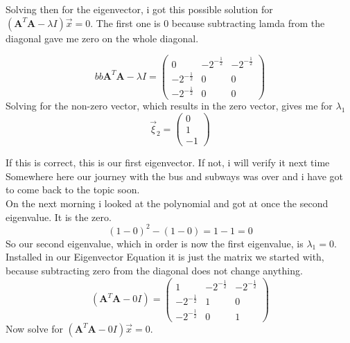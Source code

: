 \documentclass[a4paper]{article}
\begin{document}
\begin{PropositionOpt4}
Solving then for the eigenvector, i got this possible solution for $(\boldsymbol{A}^{T}\boldsymbol{A}-\lambda I)\vec{x}=0$. The first one is 0 because subtracting lamda from the diagonal gave me zero on the whole diagonal.

\begin{displaymath}bb
\boldsymbol{A}^{T}\boldsymbol{A}-\lambda{I} = \begin{pmatrix}0&-2^{-\frac12}&-2^{-\frac12}\\-2^{-\frac12}&0&0\\-2^{-\frac12}&0&0\end{pmatrix}
\end{displaymath}
Solving for the non-zero vector, which results in the zero vector, gives me for $\lambda_{1}$
\begin{displaymath}
\vec{\xi}_{2} = \begin{pmatrix}0\\1\\-1\end{pmatrix}
\end{displaymath}

If this is correct, this is our first eigenvector. If not, i will verify it next time\\

Somewhere here our journey with the bus and subways was over and i have got to come back to the topic soon.\\

On the next morning i looked at the polynomial and got at once the second eigenvalue. It is the zero.
\begin{displaymath}
(1-0)^{2}-(1-0) = 1-1 = 0
\end{displaymath}
So our second eigenvalue, which in order is now the first eigenvalue, is $\lambda_1 = 0$. Installed in our Eigenvector Equation it is just the matrix we started with, because subtracting zero from the diagonal does not change anything.
\begin{displaymath}
(\boldsymbol{A}^{T}\boldsymbol{A}-0I) = \begin{pmatrix}1&-2^{-\frac12}&-2^{-\frac12}\\-2^{-\frac12}&1&0\\-2^{-\frac12}&0&1\end{pmatrix}
\end{displaymath}
Now solve for $(\boldsymbol{A}^{T}\boldsymbol{A}-0I)\vec{x}=0$.
\begin{displaymath}
\end{displaymath}


\end{PropositionOpt4}
\end{document}
